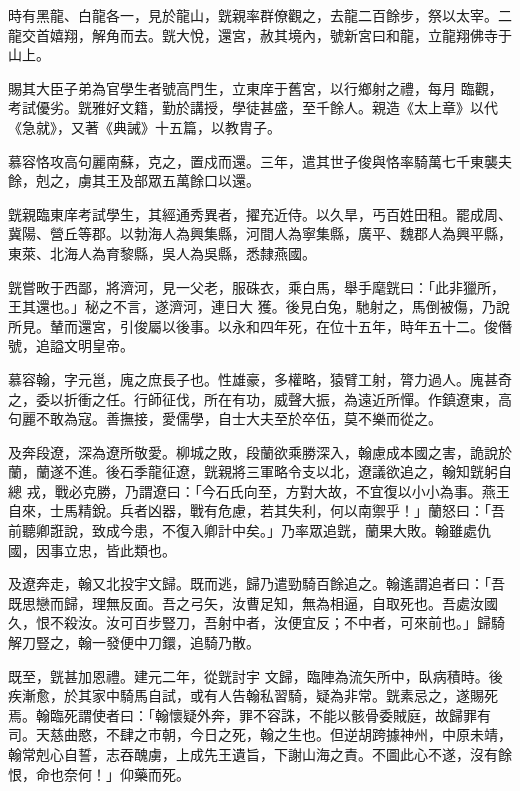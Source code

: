 \begin{pinyinscope}
 時有黑龍、白龍各一，見於龍山，皝親率群僚觀之，去龍二百餘步，祭以太宰。二龍交首嬉翔，解角而去。皝大悅，還宮，赦其境內，號新宮曰和龍，立龍翔佛寺于山上。



 賜其大臣子弟為官學生者號高門生，立東庠于舊宮，以行鄉射之禮，每月
 臨觀，考試優劣。皝雅好文籍，勤於講授，學徒甚盛，至千餘人。親造《太上章》以代《急就》，又著《典誡》十五篇，以教胄子。



 慕容恪攻高句麗南蘇，克之，置戍而還。三年，遣其世子俊與恪率騎萬七千東襲夫餘，剋之，虜其王及部眾五萬餘口以還。



 皝親臨東庠考試學生，其經通秀異者，擢充近侍。以久旱，丐百姓田租。罷成周、冀陽、營丘等郡。以勃海人為興集縣，河間人為寧集縣，廣平、魏郡人為興平縣，東萊、北海人為育黎縣，吳人為吳縣，悉隸燕國。



 皝嘗畋于西鄙，將濟河，見一父老，服硃衣，乘白馬，舉手麾皝曰：「此非獵所，王其還也。」秘之不言，遂濟河，連日大
 獲。後見白兔，馳射之，馬倒被傷，乃說所見。輦而還宮，引俊屬以後事。以永和四年死，在位十五年，時年五十二。俊僭號，追謚文明皇帝。



 慕容翰，字元邕，廆之庶長子也。性雄豪，多權略，猿臂工射，膂力過人。廆甚奇之，委以折衝之任。行師征伐，所在有功，威聲大振，為遠近所憚。作鎮遼東，高句麗不敢為寇。善撫接，愛儒學，自士大夫至於卒伍，莫不樂而從之。



 及奔段遼，深為遼所敬愛。柳城之敗，段蘭欲乘勝深入，翰慮成本國之害，詭說於蘭，蘭遂不進。後石季龍征遼，皝親將三軍略令支以北，遼議欲追之，翰知皝躬自總
 戎，戰必克勝，乃謂遼曰：「今石氏向至，方對大故，不宜復以小小為事。燕王自來，士馬精銳。兵者凶器，戰有危慮，若其失利，何以南禦乎！」蘭怒曰：「吾前聽卿誑說，致成今患，不復入卿計中矣。」乃率眾追皝，蘭果大敗。翰雖處仇國，因事立忠，皆此類也。



 及遼奔走，翰又北投宇文歸。既而逃，歸乃遣勁騎百餘追之。翰遙謂追者曰：「吾既思戀而歸，理無反面。吾之弓矢，汝曹足知，無為相逼，自取死也。吾處汝國久，恨不殺汝。汝可百步豎刀，吾射中者，汝便宜反；不中者，可來前也。」歸騎解刀豎之，翰一發便中刀鐶，追騎乃散。



 既至，皝甚加恩禮。建元二年，從皝討宇
 文歸，臨陣為流矢所中，臥病積時。後疾漸愈，於其家中騎馬自試，或有人告翰私習騎，疑為非常。皝素忌之，遂賜死焉。翰臨死謂使者曰：「翰懷疑外奔，罪不容誅，不能以骸骨委賊庭，故歸罪有司。天慈曲愍，不肆之市朝，今日之死，翰之生也。但逆胡跨據神州，中原未靖，翰常剋心自誓，志吞醜虜，上成先王遺旨，下謝山海之責。不圖此心不遂，沒有餘恨，命也奈何！」仰藥而死。




\end{pinyinscope}
